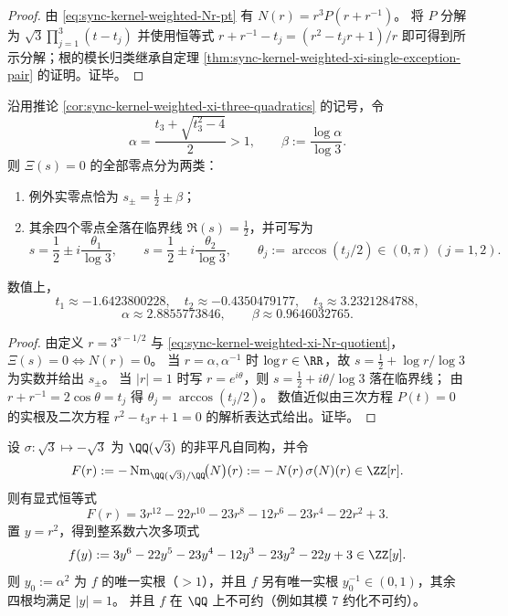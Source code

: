 \begin{proof}
由 \eqref{eq:sync-kernel-weighted-Nr-pt} 有 \(N(r)=r^3P(r+r^{-1})\)。
将 \(P\) 分解为 \(\sqrt3\prod_{j=1}^{3}(t-t_j)\) 并使用恒等式
\(
r+r^{-1}-t_j=(r^2-t_jr+1)/r
\)
即可得到所示分解；根的模长归类继承自定理 \ref{thm:sync-kernel-weighted-xi-single-exception-pair} 的证明。证毕。
\end{proof}

\begin{theorem}[例外零点的显式坐标与偏离指数]\label{thm:sync-kernel-weighted-xi-exception-coordinate}
沿用推论 \ref{cor:sync-kernel-weighted-xi-three-quadratics} 的记号，令
\[
\alpha=\frac{t_3+\sqrt{t_3^2-4}}{2}>1,
\qquad
\beta:=\frac{\log\alpha}{\log 3}.
\]
则 \(\Xi(s)=0\) 的全部零点分为两类：
\begin{enumerate}
  \item 例外实零点恰为 \(s_\pm=\frac12\pm\beta\)；
  \item 其余四个零点全落在临界线 \(\Re(s)=\tfrac12\)，并可写为
  \[
  s=\frac12\pm i\frac{\theta_1}{\log 3},
  \qquad
  s=\frac12\pm i\frac{\theta_2}{\log 3},
  \qquad
  \theta_j:=\arccos(t_j/2)\in(0,\pi)\ (j=1,2).
  \]
\end{enumerate}
数值上，
\[
t_1\approx-1.6423800228,\quad t_2\approx-0.4350479177,\quad t_3\approx3.2321284788,
\]
\[
\alpha\approx 2.8855773846,\qquad \beta\approx 0.9646032765.
\]
\end{theorem}

\begin{proof}
由定义 \(r=3^{s-1/2}\) 与 \eqref{eq:sync-kernel-weighted-xi-Nr-quotient}，\(\Xi(s)=0\iff N(r)=0\)。
当 \(r=\alpha,\alpha^{-1}\) 时 \(\log r\in\RR\)，故 \(s=\frac12+\log r/\log 3\) 为实数并给出 \(s_\pm\)。
当 \(|r|=1\) 时写 \(r=e^{i\theta}\)，则 \(s=\frac12+i\theta/\log 3\) 落在临界线；
由 \(r+r^{-1}=2\cos\theta=t_j\) 得 \(\theta_j=\arccos(t_j/2)\)。
数值近似由三次方程 \(P(t)=0\) 的实根及二次方程 \(r^2-t_3r+1=0\) 的解析表达式给出。证毕。
\end{proof}

\begin{proposition}\label{prop:sync-kernel-weighted-xi-norm-salem}
设 \(\sigma:\sqrt3\mapsto-\sqrt3\) 为 \(\QQ(\sqrt3)\) 的非平凡自同构，并令
\[
F(r):=-\,\mathrm{Nm}_{\QQ(\sqrt3)/\QQ}\!\bigl(N\bigr)(r):=-\,N(r)\,\sigma(N)(r)\in\ZZ[r].
\]
则有显式恒等式
\[
F(r)=3r^{12}-22r^{10}-23r^{8}-12r^{6}-23r^{4}-22r^{2}+3.
\]
置 \(y=r^2\)，得到整系数六次多项式
\[
f(y):=3y^{6}-22y^{5}-23y^{4}-12y^{3}-23y^{2}-22y+3\in\ZZ[y].
\]
则 \(y_0:=\alpha^2\) 为 \(f\) 的唯一实根（\(>1\)），并且 \(f\) 另有唯一实根 \(y_0^{-1}\in(0,1)\)，其余四根均满足 \(|y|=1\)。
并且 \(f\) 在 \(\QQ\) 上不可约（例如其模 \(7\) 约化不可约）。
\end{proposition}

